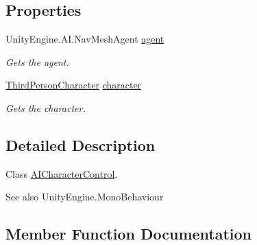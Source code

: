 \subsection*{Properties}
\begin{DoxyCompactItemize}
\item 
Unity\+Engine.\+A\+I.\+Nav\+Mesh\+Agent \hyperlink{class_lerp2_assets_1_1_characters_1_1_third_person_1_1_a_i_character_control_a2361a83daf29e82302d9768d53898e1d}{agent}
\begin{DoxyCompactList}\small\item\em Gets the agent. \end{DoxyCompactList}\item 
\hyperlink{class_lerp2_assets_1_1_characters_1_1_third_person_1_1_third_person_character}{Third\+Person\+Character} \hyperlink{class_lerp2_assets_1_1_characters_1_1_third_person_1_1_a_i_character_control_a7a5d9019472849a7c4432a701506fc92}{character}
\begin{DoxyCompactList}\small\item\em Gets the character. \end{DoxyCompactList}\end{DoxyCompactItemize}


\subsection{Detailed Description}
Class \hyperlink{class_lerp2_assets_1_1_characters_1_1_third_person_1_1_a_i_character_control}{A\+I\+Character\+Control}. 

\begin{DoxySeeAlso}{See also}
Unity\+Engine.\+Mono\+Behaviour


\end{DoxySeeAlso}


\subsection{Member Function Documentation}
\mbox{\label{class_lerp2_assets_1_1_characters_1_1_third_person_1_1_a_i_character_control_ac80a324a10dd4b37e1afda95e97c0093}} 
